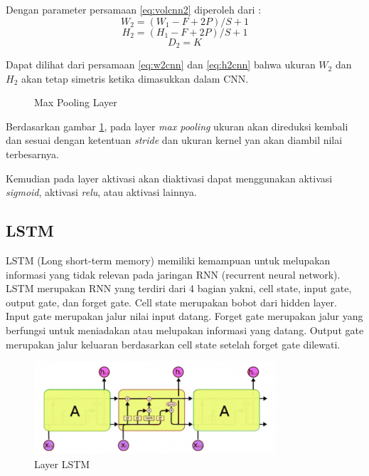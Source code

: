 \documentclass[./skripsi.tex]{subfiles}
\begin{document}
Dengan parameter persamaan \ref{eq:volcnn2} diperoleh dari :
\begin{equation}
    W_2 = (W_1 - F + 2P)/S + 1
    \label{eq:w2cnn}
\end{equation}
\begin{equation}
    H_2 = (H_1 - F + 2P)/S + 1
    \label{eq:h2cnn}
\end{equation}
\begin{equation}
    D_2 = K
    \label{eq:d2cnn}
\end{equation}
\par Dapat dilihat dari persamaan \ref{eq:w2cnn} dan \ref{eq:h2cnn} bahwa ukuran $W_2$ dan $H_2$ akan tetap simetris ketika dimasukkan dalam CNN.
\begin{figure}[H]
    \centering
    \caption{Max Pooling Layer}
    \label{fig:maxpool}
\end{figure}
\par Berdasarkan gambar \ref{fig:maxpool}, pada layer \textit{max pooling} ukuran akan direduksi kembali dan sesuai dengan ketentuan \textit{stride} dan ukuran kernel yan akan diambil nilai terbesarnya.
\par Kemudian pada layer aktivasi akan diaktivasi dapat menggunakan aktivasi \textit{sigmoid}, aktivasi \textit{relu}, atau aktivasi lainnya.
\subsection{LSTM} 
\par LSTM (Long short-term memory) memiliki kemampuan untuk melupakan informasi yang tidak relevan pada jaringan RNN (recurrent neural network). LSTM merupakan RNN yang terdiri dari 4 bagian yakni, cell state, input gate, output gate, dan forget gate. Cell state merupakan bobot dari hidden layer. Input gate merupakan jalur nilai input datang. Forget gate merupakan jalur yang berfungsi untuk meniadakan atau melupakan informasi yang datang. Output gate merupakan jalur keluaran berdasarkan cell state setelah forget gate dilewati.

\begin{figure}[H]
    \centering
    \includegraphics[width=0.8\textwidth]{public/assets/img/LSTM1.png}
    \caption{Layer LSTM}
    \label{fig:lstm1}
\end{figure}
\end{document}
